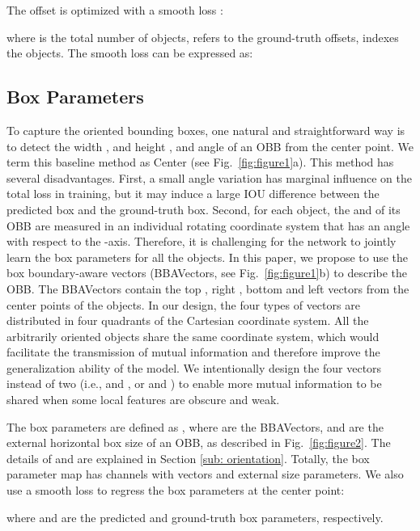 \documentclass[10pt,twocolumn,letterpaper]{article}
\begin{document}
The offset is optimized with a smooth  loss \cite{girshick2015fast}:

where  is the total number of objects,  refers to the ground-truth offsets,  indexes the objects. The smooth  loss can be expressed as:


\subsection{Box Parameters}
To capture the oriented bounding boxes, one natural and straightforward way is to detect the width , and height , and angle  of an OBB from the center point. We term this baseline method as Center (see Fig.~\ref{fig:figure1}a). This method has several disadvantages. First, a small angle variation has marginal influence on the total loss in training, but it may induce a large IOU difference between the predicted box and the ground-truth box. Second, for each object, the  and  of its OBB are measured in an individual rotating coordinate system that has an angle  with respect to the -axis. Therefore, it is challenging for the network to jointly learn the box parameters for all the objects. In this paper, we propose to use the box boundary-aware vectors (BBAVectors, see Fig.~\ref{fig:figure1}b) to describe the OBB. The BBAVectors contain the top , right , bottom  and left  vectors from the center points of the objects. In our design, the four types of vectors are distributed in four quadrants of the Cartesian coordinate system. All the arbitrarily oriented objects share the same coordinate system, which would facilitate the transmission of mutual information and therefore improve the generalization ability of the model. We intentionally design the four vectors instead of two (i.e.,  and , or  and ) to enable more mutual information to be shared when some local features are obscure and weak.


The box parameters are defined as , where  are the BBAVectors,  and  are the external horizontal box size of an OBB, as described in Fig.~\ref{fig:figure2}. The details of  and  are explained in Section \ref{sub: orientation}. Totally, the box parameter map  has  channels with  vectors and  external size parameters. We also use a smooth  loss to regress the box parameters at the center point:

where  and  are the predicted and ground-truth box parameters, respectively.
\end{document}

